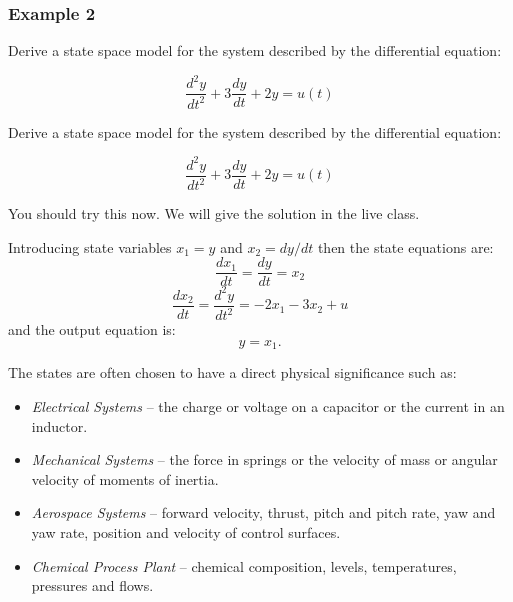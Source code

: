 \subsubsection*{Example 2}

Derive a state space model for the system described by the differential equation:

$$\frac{d^2y}{dt^2}+3\frac{dy}{dt}+2y=u(t)$$
\ifslidesonly
\begin{slide}

	Derive a state space model for the system described by the differential equation:

	$$\frac{d^2y}{dt^2}+3\frac{dy}{dt}+2y=u(t)$$

	You should try this now. We will give the solution in the live class.
\end{slide}
\fi
Introducing state variables $x_1=y$ and $x_2=dy/dt$ then the state equations are:
$$\frac{dx_1}{dt}=\frac{dy}{dt}=x_2$$
$$\frac{dx_2}{dt}=\frac{d^2y}{dt^2}=-2x_1 - 3x_2 + u$$
and the output equation is:
$$y=x_1.$$

\begin{slide}
The states are often chosen to have a direct physical significance such as:

\begin{itemize}
	\item \emph{Electrical Systems} -- the charge or voltage on a capacitor or the current in an inductor.
    \item \emph{Mechanical Systems} -- the force in springs or the velocity of mass or angular velocity of moments of inertia.
    \item \emph{Aerospace Systems} -- forward velocity, thrust, pitch and pitch rate, yaw and yaw rate, position and velocity of control surfaces.
    \item \emph{Chemical Process Plant} -- chemical composition, levels, temperatures, pressures and flows.
\end{itemize}
\end{slide}

